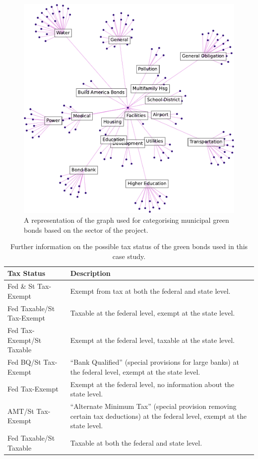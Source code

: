 \begin{figure}[t]  
    \begin{center}
        \includegraphics[width=0.8\linewidth]{Figures/bond_graph.pdf}
    \end{center}
   \caption[Graph categorising green bonds based on sector]{A representation of the graph used for categorising municipal green bonds based on the sector of the project. } 
    \label{fig:green_bond_graph}
    \vspace{1.5cm}
\end{figure} 

\begin{table}[t]
    \centering
    \def\arraystretch{1.5}
    \begin{tabular}{l p{9cm}}
        \toprule
        \textbf{Tax Status} & \textbf{Description} \\ 
        \midrule
        Fed \& St Tax-Exempt & Exempt from tax at both the federal and state level.  \\ 
        Fed Taxable/St Tax-Exempt & Taxable at the federal level, exempt at the state level.  \\ 
        Fed Tax-Exempt/St Taxable & Exempt at the federal level, taxable at the state level. \\ 
        Fed BQ/St Tax-Exempt & ``Bank Qualified'' (special provisions for large banks) at the federal level, exempt at the state level.  \\ 
        Fed Tax-Exempt & Exempt at the federal level, no information about the state level. \\ 
        AMT/St Tax-Exempt & ``Alternate Minimum Tax'' (special provision removing certain tax deductions) at the federal level, exempt at the state level. \\ 
        Fed Taxable/St Taxable & Taxable at both the federal and state level. \\ 
        \bottomrule
       \end{tabular}
        \caption[Information on the tax status of green bonds]{Further information on the possible tax status of the green bonds used in this case study.}
        \label{table:student}
\end{table}

